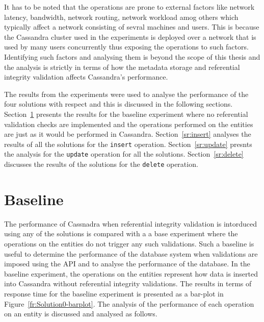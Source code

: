 It has to be noted that the operations are prone to  external factors like
network latency, bandwidth, network routing, network workload amog others which
typically affect a network consisting of sevral machines and users. This is
because the Cassandra cluster used in the experiments is deployed over a
network that is used by many users concurrently thus exposing the operations to
such factors. Identifying such factors and analysing them is beyond the scope of
this thesis and the analysis is strictly in terms of how the metadata storage
and referential integrity validation affects Cassandra's performance.

 The results from the experiments were used to
analyse the performance of the four solutions with respect and this is discussed
in the following sections. Section~\ref{sr:baseline} presents the results for
the baseline experiment where no referential validation checks are implemented
and the operations performed on the entities are just as it would be performed in
Cassandra. Section~\ref{sr:insert} analyses the results of all the solutions
for the \texttt{insert} operation. Section~\ref{sr:update} presnts the analysis
for the \texttt{update} operation for all the solutions. Section~\ref{sr:delete}
discusses the results of the solutions for the \texttt{delete} operation. 


\section{Baseline}\label{sr:baseline}
The performance of Cassnadra when referential
integrity validation is intorduced using any of the solutions is compared with a
a base experiment where the operations on the entities do not trigger any
such validations. Such a baseline is useful to determine the
performance of the database system when validations are imposed using the
\ac{API} and to analyse the performance of the database.
In the baseline experiment, the operations on the entities represent how
data is inserted into Cassandra without referential integrity validations. The
results in terms of response time for the baseline experiment is presented as
a bar-plot in Figure~\ref{fr:Solution0-barplot}. The analysis of
the performance of each operation on an entity is discussed and analysed as follows.

	
